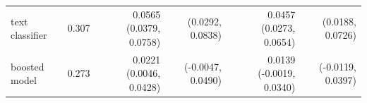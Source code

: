 \begin{tabular}{lrrrrr}
text classifier & 0.307 & 0.0565 (0.0379, 0.0758) & (0.0292, 0.0838) & 0.0457 (0.0273, 0.0654) & (0.0188, 0.0726) \\
boosted model & 0.273 & 0.0221 (0.0046, 0.0428) & (-0.0047, 0.0490) & 0.0139 (-0.0019, 0.0340) & (-0.0119, 0.0397) \\

\end{tabular}
